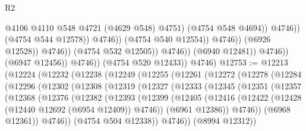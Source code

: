 \begin{lexlean}{R2}
\begin{coremodule}
                                                    @4106
                                                    @4110
                                                    @548
                                                    @4721
                                                    (@4629 @548)
                                                    @4751)
                                                  (@4754 @548 @4694))
                                                @4746))
                                            (@4754 @544 @12578))
                                          @4746))
                                      (@4754 @540 @12554))
                                    @4746))
                                (@6926 @12528))
                              @4746))
                          (@4754 @532 @12505))
                        @4746))
                    (@6940 @12481))
                  @4746))
              (@6947 @12456))
            @4746))
        (@4754 @520 @12433))
      @4746)
@12753 := @12213
    (@12224
      (@12232
        (@12238
          (@12249
            (@12255
              (@12261
                (@12272
                  (@12278
                    (@12284
                      (@12296
                        (@12302
                          (@12308
                            (@12319
                              (@12327
                                (@12333
                                  (@12345
                                    (@12351
                                      (@12357
                                        (@12368
                                          (@12376
                                            (@12382
                                              (@12393
                                                (@12399
                                                  (@12405
                                                    (@12416
                                                      (@12422
                                                        (@12428
                                                          (@12440 @12692 (@6954 @12409))
                                                          @4746))
                                                      (@6961 @12386))
                                                    @4746))
                                                (@6968 @12361))
                                              @4746))
                                          (@4754 @504 @12338))
                                        @4746))
                                    (@8994 @12312))

\end{coremodule}
\end{lexlean}
